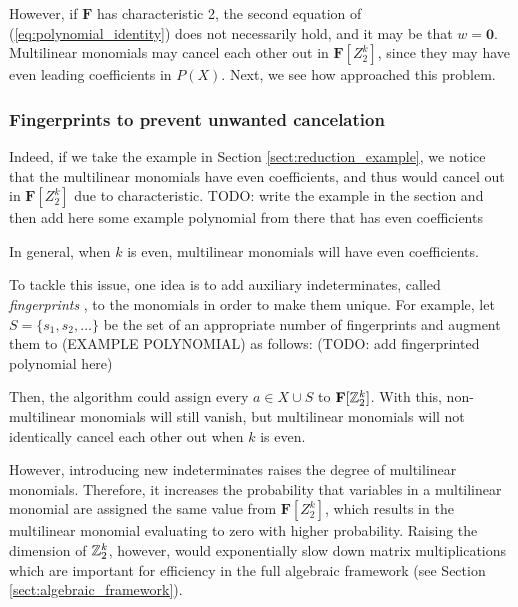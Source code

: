 However, if $\mathbf{F}$ has characteristic 2, the second equation of (\ref{eq:polynomial_identity}) 
does not necessarily hold, and it may be that $w = \mathbf{0}$. Multilinear monomials may 
cancel each other out in $\mathbf{F}[Z_2^k]$, since they may have even leading 
coefficients in $P(X)$. Next, we see how \citeauthor{Koutis08} approached this problem.

\subsubsection{Fingerprints to prevent unwanted cancelation}
\label{sect:fingerprints}

Indeed, if we take the example in Section \ref{sect:reduction_example}, 
we notice that the multilinear monomials have even coefficients, and thus 
would cancel out in $\mathbf{F}[Z_2^k]$ due to characteristic. TODO: 
write the example in the section and then 
add here some   
example polynomial from there that has even coefficients

In general, when $k$ is even, multilinear monomials will have even coefficients. 

To tackle this issue, one idea is to add auxiliary indeterminates, 
called \emph{fingerprints} \cite{KouWil15}, to the monomials 
in order to make them unique. For example, let $S = \{s_1, s_2, \ldots\}$ 
be the set of an appropriate number of fingerprints 
and augment them to (EXAMPLE POLYNOMIAL) as follows: 
(TODO: add fingerprinted polynomial here) 

Then, the algorithm could assign every $a \in X \cup S$ to $\mathbf{F}[\mathbb Z_2^k]$. 
With this, non-multilinear monomials will still vanish, but multilinear monomials 
will not identically cancel each other out when $k$ is even. 

However, introducing new indeterminates raises the degree of multilinear monomials. 
Therefore, it increases the probability that variables in a multilinear monomial are 
assigned the same value from $\mathbf{F}[Z_2^k]$, which results in the 
multilinear monomial evaluating to zero with higher probability. 
Raising the dimension of $\mathbb Z_2^k$, however, would  
exponentially slow down matrix multiplications which are %
important for efficiency in the full algebraic framework (see Section \ref{sect:algebraic_framework}).

